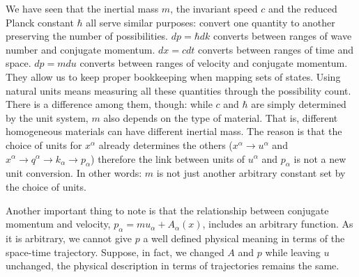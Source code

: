 \documentclass[smallextended]{svjour3}
\numberwithin{equation}{section}
\theoremstyle{definition}
\begin{document}
We have seen that the inertial mass $m$, the invariant speed $c$ and the reduced Planck constant $\hbar$ all serve similar purposes: convert one quantity to another preserving the number of possibilities. $dp=\hbar dk$ converts between ranges of wave number and conjugate momentum. $dx = c dt$ converts between ranges of time and space. $dp = m du$ converts between ranges of velocity and conjugate momentum. They allow us to keep proper bookkeeping when mapping sets of states. Using natural units means measuring all these quantities through the possibility count. There is a difference among them, though: while $c$ and $\hbar$ are simply determined by the unit system, $m$ also depends on the type of material. That is, different homogeneous materials can have different inertial mass. The reason is that the choice of units for $x^\alpha$ already determines the others ($x^\alpha \rightarrow u^\alpha$ and $x^\alpha \rightarrow q^\alpha \rightarrow k_\alpha \rightarrow p_\alpha$) therefore the link between units of $u^\alpha$ and $p_\alpha$ is not a new unit conversion. In other words: $m$ is not just another arbitrary constant set by the choice of units.

Another important thing to note is that the relationship between conjugate momentum and velocity, $p_\alpha = m u_\alpha + A_\alpha(x)$, includes an arbitrary function. As it is arbitrary, we cannot give $p$ a well defined physical meaning in terms of the space-time trajectory. Suppose, in fact, we changed $A$ and $p$ while leaving $u$ unchanged, the physical description in terms of trajectories remains the same.
\end{document}
